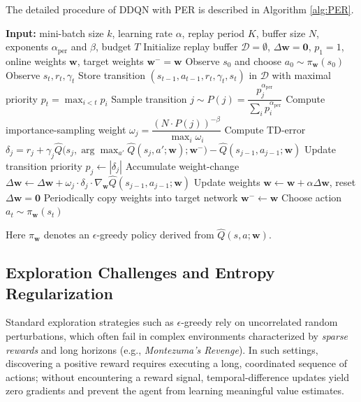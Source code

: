 \documentclass[10pt, a4paper]{report}
\begin{document}
The detailed procedure of DDQN with PER is described in Algorithm \ref{alg:PER}.
\begin{algorithm}[H]
\caption{Double DQN with PER}\label{alg:PER}
\begin{algorithmic}[1]
    \State \textbf{Input:} mini-batch size $k$, learning rate $\alpha$, replay period $K$, buffer size $N$, exponents $\alpha_{\text{per}}$ and $\beta$, budget $T$
    \State Initialize replay buffer $\mathcal{D} = \emptyset$, $\Delta \mathbf{w} = \mathbf{0}$, $p_1 = 1$, online weights $\mathbf{w}$, target weights $\mathbf{w}^- = \mathbf{w}$
    \State Observe $s_0$ and choose $a_0 \sim \pi_{\mathbf{w}}(s_0)$
        \State Observe $s_t, r_t, \gamma_t$
        \State Store transition $(s_{t-1}, a_{t-1}, r_t, \gamma_t, s_t)$ in $\mathcal{D}$ with maximal priority $p_t = \max_{i < t} p_i$
                \State Sample transition $j \sim P(j) = \dfrac{p_j^{\alpha_{\text{per}}}}{\sum_i p_i^{\alpha_{\text{per}}}}$
                \State Compute importance-sampling weight $\omega_j = \dfrac{(N \cdot P(j))^{-\beta}}{\max_i \omega_i}$
                \State Compute TD-error $\delta_j = r_j + \gamma_j \hat{Q}\Big(s_j, \arg\max_{a'} \hat{Q}(s_j, a'; \mathbf{w}); \mathbf{w}^-\Big) - \hat{Q}(s_{j-1}, a_{j-1}; \mathbf{w})$
                \State Update transition priority $p_j \leftarrow |\delta_j|$
                \State Accumulate weight-change $\Delta \mathbf{w} \leftarrow \Delta \mathbf{w} + \omega_j \cdot \delta_j \cdot \nabla_{\mathbf{w}} \hat{Q}(s_{j-1}, a_{j-1}; \mathbf{w})$
            \EndFor
            \State Update weights $\mathbf{w} \leftarrow \mathbf{w} + \alpha \Delta \mathbf{w}$, reset $\Delta \mathbf{w} = \mathbf{0}$
            \State Periodically copy weights into target network $\mathbf{w}^- \leftarrow \mathbf{w}$
        \EndIf
        \State Choose action $a_t \sim \pi_{\mathbf{w}}(s_t)$
    \EndFor
\end{algorithmic}
\end{algorithm}
\noindent Here $\pi_{\mathbf w}$ denotes an $\epsilon$-greedy policy derived from $\hat Q(s,a;\mathbf w)$.
\subsection{Exploration Challenges and Entropy Regularization}

Standard exploration strategies such as $\epsilon$-greedy rely on uncorrelated random perturbations, which often fail in complex environments characterized by \emph{sparse rewards} and long horizons (e.g., \emph{Montezuma's Revenge}). In such settings, discovering a positive reward requires executing a long, coordinated sequence of actions; without encountering a reward signal, temporal-difference updates yield zero gradients and prevent the agent from learning meaningful value estimates.
\end{document}
